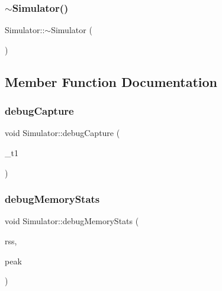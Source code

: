 \mbox{\label{class_simulator_a0f49aa04f42060a785adf77346b9de9f}} 
\subsubsection{\texorpdfstring{$\sim$Simulator()}{~Simulator()}}
{\footnotesize\ttfamily Simulator\+::$\sim$\+Simulator (\begin{DoxyParamCaption}{ }\end{DoxyParamCaption})}



\subsection{Member Function Documentation}
\mbox{\label{class_simulator_a39861df2b7110b42c10a9c67b0cf126c}} 
\subsubsection{\texorpdfstring{debugCapture}{debugCapture}}
{\footnotesize\ttfamily void Simulator\+::debug\+Capture (\begin{DoxyParamCaption}\item[{Q\+String}]{\+\_\+t1 }\end{DoxyParamCaption})\hspace{0.3cm}{\ttfamily [signal]}}

\mbox{\label{class_simulator_afdd8bbc35c2a0e3957f2bca7d67237bd}} 
\subsubsection{\texorpdfstring{debugMemoryStats}{debugMemoryStats}}
{\footnotesize\ttfamily void Simulator\+::debug\+Memory\+Stats (\begin{DoxyParamCaption}\item[{long}]{rss,  }\item[{long}]{peak }\end{DoxyParamCaption})\hspace{0.3cm}{\ttfamily [signal]}}

